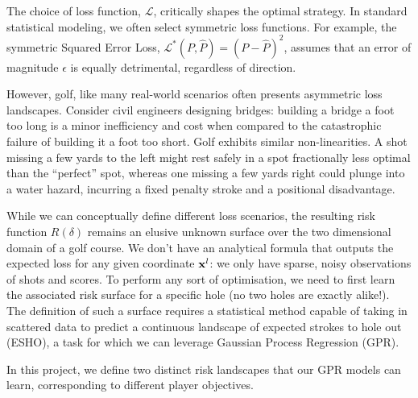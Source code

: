 \documentclass[11pt, letterpaper]{article}
\begin{document}
The choice of loss function, $\mathcal{L}$, critically shapes the optimal strategy. In standard statistical modeling, we often select symmetric loss functions. For example, the symmetric Squared Error Loss, $\mathcal{L}^*(P, \hat{P}) = (P - \hat{P})^2 $, assumes that an error of magnitude $\epsilon$ is equally detrimental, regardless of direction. 

However, golf, like many real-world scenarios often presents asymmetric loss landscapes. Consider civil engineers designing bridges: building a bridge a foot too long is a minor inefficiency and cost when compared to the catastrophic failure of building it a foot too short. Golf exhibits similar non-linearities. A shot missing a few yards to the left might rest safely in a spot fractionally less optimal than the ``perfect'' spot, whereas one missing a few yards right could plunge into a water hazard, incurring a fixed penalty stroke and a positional disadvantage.

While we can conceptually define different loss scenarios, the resulting risk function $R(\delta)$ remains an elusive unknown surface over the two dimensional domain of a golf course. We don't have an analytical formula that outputs the expected loss for any given coordinate $\mathbf{x}^l$: we only have sparse, noisy observations of shots and scores. To perform any sort of optimisation, we need to first learn the associated risk surface for a specific hole (no two holes are exactly alike!). The definition of such a surface requires a statistical method capable of taking in scattered data to predict a continuous landscape of expected strokes to hole out (ESHO), a task for which we can leverage Gaussian Process Regression (GPR). 

In this project, we define two distinct risk landscapes that our GPR models can learn, corresponding to different player objectives.
\end{document}
